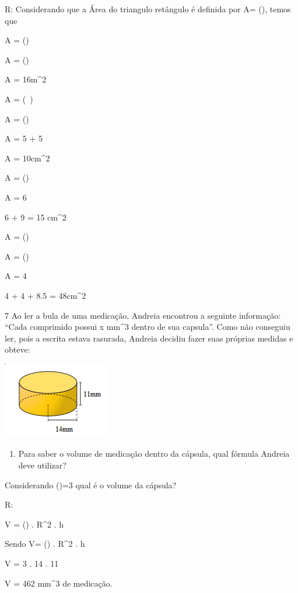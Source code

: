{R: Considerando que a Área do triangulo retângulo é definida por A=
(), temos que
\item

A = ()

A = ()

A = 16m^2
\item

A = (\ )

A = ()

A = 5 + 5

A = 10cm^2
\item

A = ()

A = 6

6 + 9 = 15 cm^2
\item

A = ()

A = ()

A = 4

4 + 4 + 8.5 = 48cm^2

\num{7} Ao ler a bula de uma medicação, Andreia encontrou a seguinte
informação: ``Cada comprimido possui x mm^3 dentro de sua capsula''. Como
não conseguiu ler, pois a escrita estava rasurada, Andreia decidiu fazer
suas próprias medidas e obteve:

\includegraphics[width=1.88542in,height=1.3125in]{./imgSAEB_8_MAT/media/image50.png}

\begin{enumerate}
\def\labelenumi{\alph{enumi})}
\tightlist
\item
  Para saber o volume de medicação dentro da cápsula, qual fórmula
  Andreia deve utilizar?
\end{enumerate}
\item Considerando (\Pi)=3 qual é o volume da cápsula?

R:
\item V = (\Pi) . R^2 . h
\item Sendo V= (\Pi) . R^2 . h

V = 3 . 14 . 11

V = 462 mm^3 de medicação.

}
